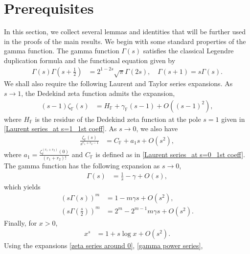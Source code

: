 \documentclass[12pt,reqno]{amsart}
\renewcommand{\(}{\left\(}
\renewcommand{\)}{\right\)}
\renewcommand{\[}{\left\[}
\renewcommand{\]}{\right\]}
\numberwithin{equation}{section}
\theoremstyle{plain}
\begin{document}
\section{{\bf Prerequisites}}
In this section, we collect several lemmas and identities that will be further used
in the proofs of the main results. We begin with some standard properties of the gamma
function. The gamma function $\Gamma(s)$ satisfies the classical Legendre duplication formula and the functional equation given by
\begin{align}\label{Legendre's Duplication Formula}
\Gamma(s)\Gamma\left(s + \frac{1}{2}\right)  &= 2^{1-2s}\sqrt{\pi}\Gamma(2s),  \quad \Gamma(s+1) = s\Gamma(s).
\end{align}
We shall also require the following Laurent and Taylor series expansions. As $s\to1$, the
Dedekind zeta function admits the expansion,
\begin{align}
(s-1)\zeta_{\mathbb{F}}(s) &= H_{\mathbb{F}}+\gamma_{\mathbb{F}}(s-1)+O\!\left((s-1)^2\right),
\label{zeta around 1}
\end{align}
where $H_{\mathbb{F}}$ is the residue of the Dedekind zeta function at the pole $s=1$ given in \eqref{Laurent series_at s=1_1st coeff}. As $s\to 0$, we also have
\begin{align}
\frac{\zeta_{\mathbb{F}}(s)}{s^{r_1+r_2-1}}
&= C_{\mathbb{F}}+a_1 s+O(s^2), \label{zeta series around 0}
\end{align}
where $a_1 =  \frac{\zeta^{(r_1+r_2)}_{\mathbb{F}}(0)}{(r_1+r_2)!}$ and $C_\mathbb{F}$ is defined as in \eqref{Laurent series_at s=0_1st coeff}.
The gamma function has the following expansion as $s \to 0$,
\begin{align*}
\Gamma(s) &=\frac{1}{s}-\gamma+O(s),
\end{align*}
which yields
\begin{align}
(s\Gamma(s))^{m} &= 1-m\gamma s+O(s^2),\label{gamma power series} \\
\left(s\Gamma\!\left(\frac{s}{2}\right)\right)^{m} &= 2^{m}-2^{m-1}m\gamma s+O(s^2).
\label{gamma series s/2}
\end{align}
Finally, for $x>0$,
\begin{align}
x^{s} &= 1+s\log x+O(s^2).
\label{exp series}
\end{align}
Using the expansions
\eqref{zeta series around 0}, \eqref{gamma power series},
\end{document}
